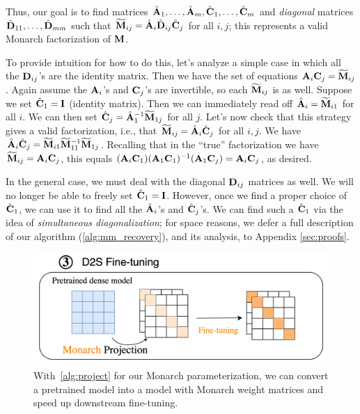 Thus, our goal is to find matrices $\hat{\mathbf{A}}_1,\dots,\hat{\mathbf{A}}_m, \hat{\mathbf{C}}_1,\dots,\hat{\mathbf{C}}_m$ and \emph{diagonal} matrices $\hat{\mathbf{D}}_{11},\dots,\hat{\mathbf{D}}_{mm}$ such that $\widetilde{\mathbf{M}}_{ij} = \hat{\mathbf{A}}_i \hat{\mathbf{D}}_{ij} \hat{\mathbf{C}}_j$ for all $i,j$; this represents a valid Monarch factorization of $\mathbf{M}$.

To provide intuition for how to do this, let's analyze a simple case in which all the $\mathbf{D}_{ij}$'s are the identity matrix. Then we have the set of equations $\mathbf{A}_i \mathbf{C}_j = \widetilde{\mathbf{M}}_{ij}$. Again assume the $\mathbf{A}_i$'s and $\mathbf{C}_j$'s are invertible, so each $\widetilde{\mathbf{M}}_{ij}$ is as well. Suppose we set $\hat{\mathbf{C}}_1 = \mathbf{I}$ (identity matrix). Then we can immediately read off $\hat{\mathbf{A}}_i = \widetilde{\mathbf{M}}_{i1}$ for all $i$. We can then set $\hat{\mathbf{C}}_j = \hat{\mathbf{A}}_1^{-1}\widetilde{\mathbf{M}}_{1j}$ for all $j$.
Let's now check that this strategy gives a valid factorization, i.e., that $\widetilde{\mathbf{M}}_{ij} = \hat{\mathbf{A}}_i \hat{\mathbf{C}}_j$ for all $i,j$. We have $\hat{\mathbf{A}}_i \hat{\mathbf{C}}_j = \widetilde{\mathbf{M}}_{i1} \widetilde{\mathbf{M}}_{11}^{-1} \widetilde{\mathbf{M}}_{1j}$. Recalling that in the ``true'' factorization we have $\widetilde{\mathbf{M}}_{ij} = \mathbf{A}_i \mathbf{C}_j$, this equals $(\mathbf{A}_i \mathbf{C}_1) (\mathbf{A}_1 \mathbf{C}_1)^{-1} (\mathbf{A}_1 \mathbf{C}_j) = \mathbf{A}_i \mathbf{C}_j$, as desired.



In the general case, we must deal with the diagonal $\mathbf{D}_{ij}$ matrices as well. We will no longer be able to freely set $\hat{\mathbf{C}}_1 = \mathbf{I}$. However, once we find a proper choice of $\hat{\mathbf{C}}_1$, we can use it to find all the $\hat{\mathbf{A}}_i$'s and $\hat{\mathbf{C}}_j$'s. We can find such a $\hat{\mathbf{C}}_1$ via the idea of \emph{simultaneous diagonalization}; for space reasons,
we defer a full description of our algorithm (\cref{alg:mm_recovery}), and its analysis, to Appendix \ref{sec:proofs}.






\begin{figure}[t]
  \centering
  \includegraphics[width=.45\textwidth]{figures/Monarch-3.png}
  \vspace{-1em}
  \caption{\label{fig:monarch_projection}With~\cref{alg:project} for our Monarch parameterization, we can convert a pretrained model into a model with Monarch weight matrices and speed up downstream fine-tuning.}
  \vspace{-1.0em}
\end{figure}



